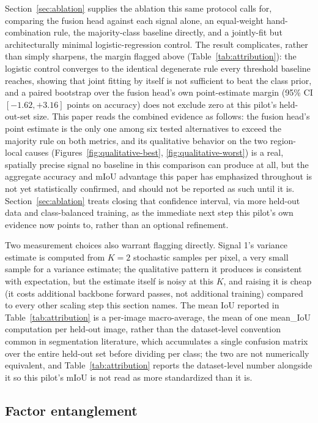 \documentclass[review]{elsarticle}
\begin{document}
Section~\ref{sec:ablation} supplies the ablation this same protocol calls for, comparing the fusion head against each signal alone, an equal-weight hand-combination rule, the majority-class baseline directly, and a jointly-fit but architecturally minimal logistic-regression control. The result complicates, rather than simply sharpens, the margin flagged above (Table~\ref{tab:attribution}): the logistic control converges to the identical degenerate rule every threshold baseline reaches, showing that joint fitting by itself is not sufficient to beat the class prior, and a paired bootstrap over the fusion head's own point-estimate margin (95\% CI $[-1.62, +3.16]$ points on accuracy) does not exclude zero at this pilot's held-out-set size. This paper reads the combined evidence as follows: the fusion head's point estimate is the only one among six tested alternatives to exceed the majority rule on both metrics, and its qualitative behavior on the two region-local causes (Figures~\ref{fig:qualitative-best}, \ref{fig:qualitative-worst}) is a real, spatially precise signal no baseline in this comparison can produce at all, but the aggregate accuracy and mIoU advantage this paper has emphasized throughout is not yet statistically confirmed, and should not be reported as such until it is. Section~\ref{sec:ablation} treats closing that confidence interval, via more held-out data and class-balanced training, as the immediate next step this pilot's own evidence now points to, rather than an optional refinement.

Two measurement choices also warrant flagging directly. Signal 1's variance estimate is computed from $K=2$ stochastic samples per pixel, a very small sample for a variance estimate; the qualitative pattern it produces is consistent with expectation, but the estimate itself is noisy at this $K$, and raising it is cheap (it costs additional backbone forward passes, not additional training) compared to every other scaling step this section names. The mean IoU reported in Table~\ref{tab:attribution} is a per-image macro-average, the mean of one mean\_IoU computation per held-out image, rather than the dataset-level convention common in segmentation literature, which accumulates a single confusion matrix over the entire held-out set before dividing per class; the two are not numerically equivalent, and Table~\ref{tab:attribution} reports the dataset-level number alongside it so this pilot's mIoU is not read as more standardized than it is.

\subsection{Factor entanglement}
\end{document}
